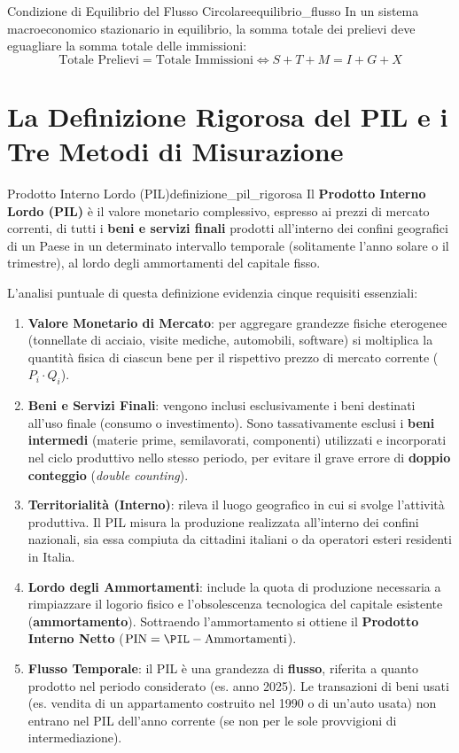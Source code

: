 \begin{teorema}{Condizione di Equilibrio del Flusso Circolare}{equilibrio_flusso}
In un sistema macroeconomico stazionario in equilibrio, la somma totale dei prelievi deve eguagliare la somma totale delle immissioni:
\begin{equation}
    \text{Totale Prelievi} = \text{Totale Immissioni} \iff S + T + M = I + G + X
\end{equation}
\end{teorema}

\section{La Definizione Rigorosa del PIL e i Tre Metodi di Misurazione}

\begin{definizione}{Prodotto Interno Lordo (PIL)}{definizione_pil_rigorosa}
Il \textbf{Prodotto Interno Lordo (PIL)} è il valore monetario complessivo, espresso ai prezzi di mercato correnti, di tutti i \textbf{beni e servizi finali} prodotti all'interno dei confini geografici di un Paese in un determinato intervallo temporale (solitamente l'anno solare o il trimestre), al lordo degli ammortamenti del capitale fisso.
\end{definizione}

L'analisi puntuale di questa definizione evidenzia cinque requisiti essenziali:
\begin{enumerate}
    \item \textbf{Valore Monetario di Mercato}: per aggregare grandezze fisiche eterogenee (tonnellate di acciaio, visite mediche, automobili, software) si moltiplica la quantità fisica di ciascun bene per il rispettivo prezzo di mercato corrente ($P_i \cdot Q_i$).
    \item \textbf{Beni e Servizi Finali}: vengono inclusi esclusivamente i beni destinati all'uso finale (consumo o investimento). Sono tassativamente esclusi i \textbf{beni intermedi} (materie prime, semilavorati, componenti) utilizzati e incorporati nel ciclo produttivo nello stesso periodo, per evitare il grave errore di \textbf{doppio conteggio} (\textit{double counting}).
    \item \textbf{Territorialità (Interno)}: rileva il luogo geografico in cui si svolge l'attività produttiva. Il PIL misura la produzione realizzata all'interno dei confini nazionali, sia essa compiuta da cittadini italiani o da operatori esteri residenti in Italia.
    \item \textbf{Lordo degli Ammortamenti}: include la quota di produzione necessaria a rimpiazzare il logorio fisico e l'obsolescenza tecnologica del capitale esistente (\textbf{ammortamento}). Sottraendo l'ammortamento si ottiene il \textbf{Prodotto Interno Netto} ($\mathrm{PIN} = \PIL - \text{Ammortamenti}$).
    \item \textbf{Flusso Temporale}: il PIL è una grandezza di \textbf{flusso}, riferita a quanto prodotto nel periodo considerato (es. anno 2025). Le transazioni di beni usati (es. vendita di un appartamento costruito nel 1990 o di un'auto usata) non entrano nel PIL dell'anno corrente (se non per le sole provvigioni di intermediazione).
\end{enumerate}

